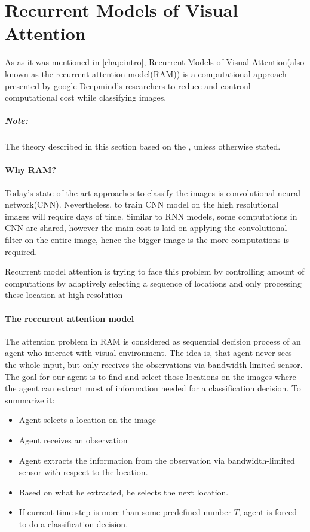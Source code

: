 \section{Recurrent Models of Visual Attention}
\label{sec:ram_model}
As as it was mentioned in \autoref{chap:intro}, Recurrent Models of Visual
Attention(also known as the recurrent attention model(RAM)) is
a computational approach presented by google Deepmind’s researchers to reduce
and contronl computational cost while classifying images.
\subparagraph{Note: } The theory described in this section based on the
\cite{DBLP:journals/corr/MnihHGK14}, unless otherwise stated.

\paragraph{Why RAM?}
Today's state of the art approaches to classify the images is convolutional
neural network(CNN). Nevertheless, to train CNN model on the high resolutional
images will require days of time. Similar to RNN models, some computations
in CNN are shared, however the main cost is laid on applying the convolutional
filter on the entire image, hence the bigger image is the
more computations is required.\cite{Krizhevsky2012}

Recurrent model attention is trying to face this problem by
controlling amount of computations by adaptively selecting a sequence of
locations and only processing these location at high-resolution


\paragraph{The reccurent attention model}
The attention problem in RAM is considered as sequential decision
process of an agent who interact with visual environment. The idea is,
that agent never sees the whole input, but only receives the observations
via bandwidth-limited sensor. The goal for our agent is
to find and select those locations on the images where the agent can extract
most of information needed for a classification decision.
To summarize it:
\begin{itemize}
	\item Agent selects a location on the image
	\item Agent receives an observation
	\item Agent extracts the information from the observation via bandwidth-limited
		sensor with respect to the location.
	\item Based on what he extracted, he selects the next location.
	\item If current time step is
		more than some predefined number $T$, agent is forced to do a
		classification decision.
\end{itemize}

